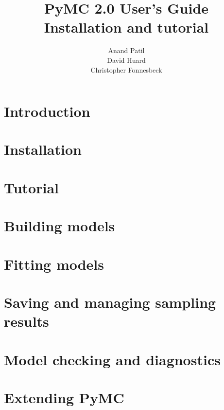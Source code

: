 \documentclass[]{manual}
\title{PyMC 2.0 User's Guide \\
Installation and tutorial}
\author{Anand Patil \\ David Huard \\ Christopher Fonnesbeck}
\begin{document}
\maketitle

\tableofcontents
\chapter{Introduction} 
\label{chap:intro} 


\chapter{Installation} 
\label{chap:install} 


\chapter{Tutorial}
\label{chap:tutorial}


\chapter{Building models}
\label{chap:modelbuilding} 


\chapter{Fitting models}
\label{chap:modelfitting}


\chapter{Saving and managing sampling results}
\label{chap:database} 


\chapter{Model checking and diagnostics} 
\label{chap:modelchecking}


\chapter{Extending PyMC}
\label{chap:extending}

\end{document}
